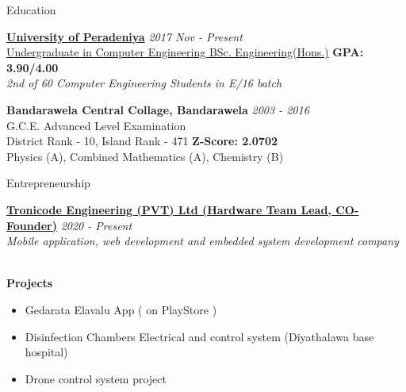 \documentclass{resume} %
\begin{document}
\begin{rSection}{Education}

{\bf \href{http://eng.pdn.ac.lk}{University of Peradeniya}} \hfill {\em 2017 Nov - Present} 
\\ \href{http://www.ce.pdn.ac.lk/undergraduate-courses}{Undergraduate in Computer Engineering BSc. Engineering(Hons.)} \hfill {\bf  GPA: 3.90/4.00} 
\\ {\em 2nd of 60 Computer Engineering Students in E/16 batch}

{\bf{Bandarawela Central Collage, Bandarawela}} \hfill {\em 2003 - 2016} 
\\ G.C.E. Advanced Level Examination
\\ District Rank - 10, Island Rank - 471 \hfill {\bf  Z-Score: 2.0702}
\\ Physics (A), Combined Mathematics (A), Chemistry (B)



\end{rSection}


\begin{rSection}{Entrepreneurship}

{\bf \href{https://www.facebook.com/tronicode.engineering}{Tronicode Engineering (PVT) Ltd (Hardware Team Lead, CO-Founder)}} \hfill {\em 2020 - Present} 
\\ {\em Mobile application, web development and embedded system development company}


\\ {\bf Projects}
\begin{itemize}
\item {Gedarata Elavalu App ( on PlayStore )}
\item {Disinfection Chambers Electrical and control system (Diyathalawa base hospital)}
\item {Drone control system project}
\end{itemize}

\end{rSection}
\end{document}
